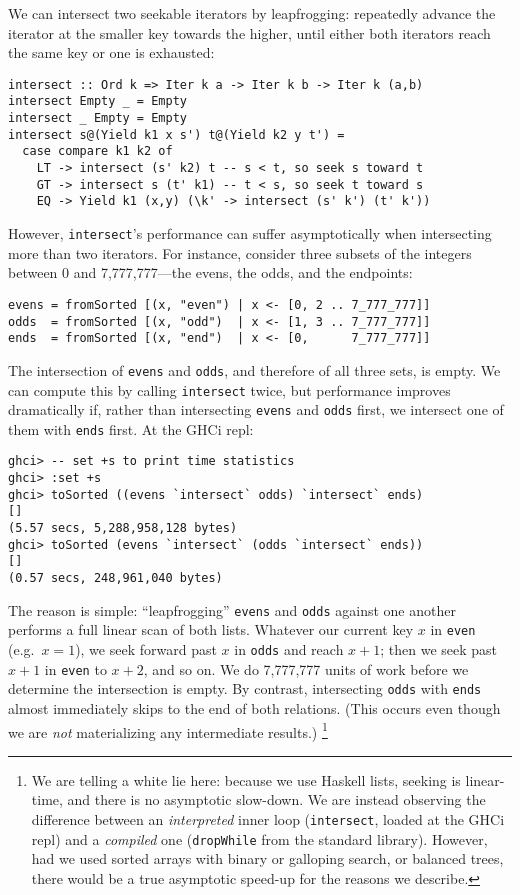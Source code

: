 \documentclass[acmsmall,screen,review,anonymous,dvipsnames,svgnames]{acmart}
\newcommand\ttt\texttt
\begin{document}
\noindent
We can intersect two seekable iterators by leapfrogging: repeatedly advance the iterator at the smaller key towards the higher, until either both iterators reach the same key or one is exhausted:

\begin{verbatim}
intersect :: Ord k => Iter k a -> Iter k b -> Iter k (a,b)
intersect Empty _ = Empty
intersect _ Empty = Empty
intersect s@(Yield k1 x s') t@(Yield k2 y t') =
  case compare k1 k2 of
    LT -> intersect (s' k2) t -- s < t, so seek s toward t
    GT -> intersect s (t' k1) -- t < s, so seek t toward s
    EQ -> Yield k1 (x,y) (\k' -> intersect (s' k') (t' k'))
\end{verbatim}

\noindent
However, \ttt{intersect}'s performance can suffer asymptotically when intersecting more than two iterators.
For instance, consider three subsets of the integers between 0 and 7,777,777---the evens, the odds, and the endpoints:

\begin{verbatim}
evens = fromSorted [(x, "even") | x <- [0, 2 .. 7_777_777]]
odds  = fromSorted [(x, "odd")  | x <- [1, 3 .. 7_777_777]]
ends  = fromSorted [(x, "end")  | x <- [0,      7_777_777]]
\end{verbatim}

\noindent
The intersection of \ttt{evens} and \ttt{odds}, and therefore of all three sets, is empty.
We can compute this by calling \ttt{intersect} twice, but performance improves dramatically if, rather than intersecting \ttt{evens} and \ttt{odds} first, we intersect one of them with \ttt{ends} first.
At the GHCi repl:

\begin{verbatim}
ghci> -- set +s to print time statistics
ghci> :set +s
ghci> toSorted ((evens `intersect` odds) `intersect` ends)
[]
(5.57 secs, 5,288,958,128 bytes)
ghci> toSorted (evens `intersect` (odds `intersect` ends))
[]
(0.57 secs, 248,961,040 bytes)
\end{verbatim}

\noindent
The reason is simple: ``leapfrogging'' \ttt{evens} and \ttt{odds} against one another performs a full linear scan of both lists.
Whatever our current key $x$ in \ttt{even} (e.g.\ $x = 1$), we seek forward past $x$ in \ttt{odds} and reach $x+1$; then we seek past $x+1$ in \ttt{even} to $x + 2$, and so on.
We do 7,777,777 units of work before we determine the intersection is empty.
%
By contrast, intersecting \ttt{odds} with \ttt{ends} almost immediately skips to the end of both relations.
(This occurs even though we are \emph{not} materializing any intermediate results.)%
\footnote{\label{fn:white-lie}%
  We are telling a white lie here: because we use Haskell lists, seeking is linear-time, and there is no asymptotic slow-down.
  We are instead observing the difference between an \emph{interpreted} inner loop (\ttt{intersect}, loaded at the GHCi repl) and a \emph{compiled} one (\ttt{dropWhile} from the standard library).
  However, had we used sorted arrays with binary or galloping search, or balanced trees, there would be a true asymptotic speed-up for the reasons we describe.
}
\end{document}
